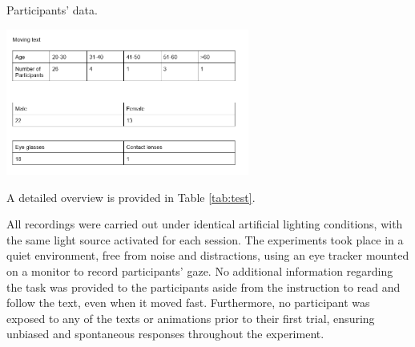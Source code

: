\documentclass[12pt]{report}
\begin{document}
\begin{table}[ht]
    \centering
    \caption{Participants’ data.} %
    \includegraphics[width=0.6\textwidth]{Images/Experiment/tester.png}
    \label{tab:test}
\end{table}


A detailed overview is provided in Table \ref{tab:test}.

All recordings were carried out under identical artificial lighting conditions, with the same light source activated for each session.
The experiments took place in a quiet environment, free from noise and distractions, using an eye tracker mounted on a monitor to record participants' gaze. 
No additional information regarding the task was provided to the participants aside from the instruction to read and follow the text, even when it moved fast. 
Furthermore, no participant was exposed to any of the texts or animations prior to their first trial, ensuring unbiased and spontaneous responses throughout the experiment.
\end{document}
